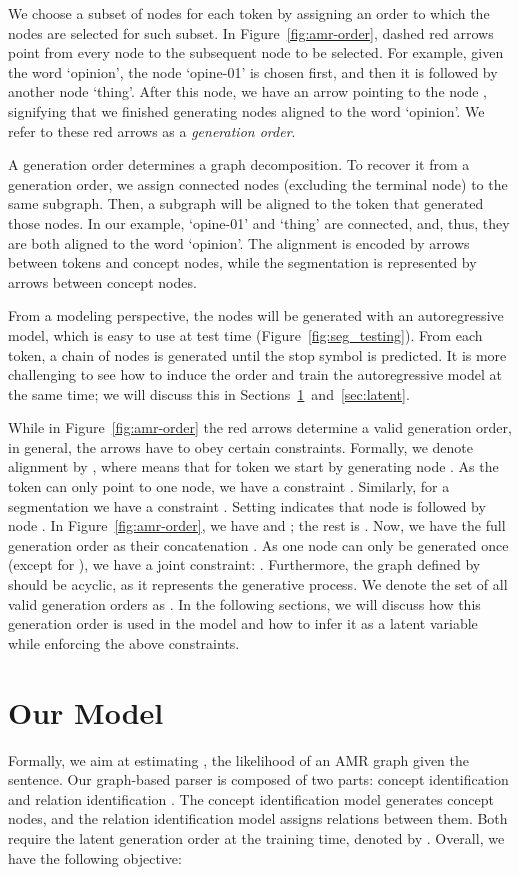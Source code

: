 \documentclass[11pt]{article}
\begin{document}
We choose a subset of nodes for each token by assigning an order to which the nodes are selected for such subset.  In Figure~\ref{fig:amr-order}, dashed red arrows point from every node to the subsequent node to be selected.  For example, given the word `opinion', the node `opine-01' is chosen first, and then it is followed by another node `thing'. After this node, we have an arrow pointing to the node , signifying that we finished generating nodes aligned to the word `opinion'. We refer to these red arrows as a {\it generation order}. 

A generation order determines a graph decomposition. To recover it from a generation order, we assign connected nodes (excluding the terminal node) to the same subgraph. Then, a subgraph will be aligned to the token that generated those nodes. In our example, `opine-01' and `thing' are connected, and, thus, they are both aligned to the word `opinion'. The alignment is encoded by arrows between tokens and concept nodes, while the segmentation is represented by arrows between concept nodes.

From a modeling perspective, the nodes will be generated with an autoregressive model,
which is easy to use at test time  (Figure~\ref{fig:seg_testing}). From each token, a chain of nodes is generated until the stop symbol   is predicted.  It is more challenging to see how to induce the order and train the autoregressive model at the same time; we will discuss this in Sections~\ref{sec:main}~and~\ref{sec:latent}.

 \quad
While in Figure~\ref{fig:amr-order} the red arrows determine a 
valid generation order, in general, the arrows have to obey certain constraints. Formally, we denote alignment by , where  means that for token  we start by generating node . As the token can only point to one node, we have a constraint . Similarly, for a segmentation  we have a constraint . Setting  indicates that node  is followed by node .  In Figure~\ref{fig:amr-order}, 
we have  and ; the rest is .
Now, we have the full generation order as their concatenation . As one node can only be generated once (except for ), we have a joint constraint: .  Furthermore, the graph defined by  should be acyclic, as it represents the generative process. We denote the set of all valid generation orders as . 
In the following sections, we will discuss how this generation order is used in the model and how to infer it as a latent variable while enforcing the above constraints. \section{Our Model}\label{sec:main}
Formally, we aim at estimating , the likelihood of an AMR graph given the sentence. Our graph-based parser is composed of two parts: concept identification  and relation identification . The concept identification model generates concept nodes, and the relation identification model assigns relations  between them. Both require the latent generation order at the training time,  denoted by . 
Overall, we have the following objective:
\end{document}
